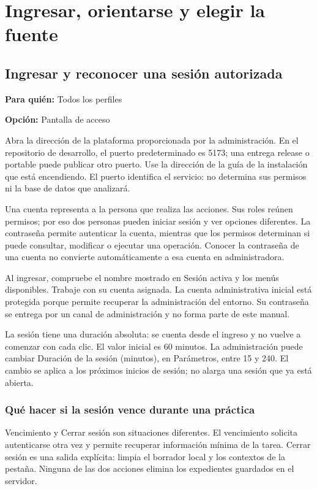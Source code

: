 \chapter{Ingresar, orientarse y elegir la fuente}
\section{Ingresar y reconocer una sesión autorizada}
\label{unidad:operacion_01}
\textbf{Para quién:} Todos los perfiles\par
\textbf{Opción:} Pantalla de acceso\par

Abra la dirección de la plataforma proporcionada por la administración. En el repositorio de desarrollo, el puerto predeterminado es 5173; una entrega release o portable puede publicar otro puerto. Use la dirección de la guía de la instalación que está encendiendo. El puerto identifica el servicio: no determina sus permisos ni la base de datos que analizará.

Una cuenta representa a la persona que realiza las acciones. Sus roles reúnen permisos; por eso dos personas pueden iniciar sesión y ver opciones diferentes. La contraseña permite autenticar la cuenta, mientras que los permisos determinan si puede consultar, modificar o ejecutar una operación. Conocer la contraseña de una cuenta no convierte automáticamente a esa cuenta en administradora.

Al ingresar, compruebe el nombre mostrado en Sesión activa y los menús disponibles. Trabaje con su cuenta asignada. La cuenta administrativa inicial está protegida porque permite recuperar la administración del entorno. Su contraseña se entrega por un canal de administración y no forma parte de este manual.

La sesión tiene una duración absoluta: se cuenta desde el ingreso y no vuelve a comenzar con cada clic. El valor inicial es 60 minutos. La administración puede cambiar Duración de la sesión (minutos), en Parámetros, entre 15 y 240. El cambio se aplica a los próximos inicios de sesión; no alarga una sesión que ya está abierta.

\subsection{Qué hacer si la sesión vence durante una práctica}
Vencimiento y Cerrar sesión son situaciones diferentes. El vencimiento solicita autenticarse otra vez y permite recuperar información mínima de la tarea. Cerrar sesión es una salida explícita: limpia el borrador local y los contextos de la pestaña. Ninguna de las dos acciones elimina los expedientes guardados en el servidor.


